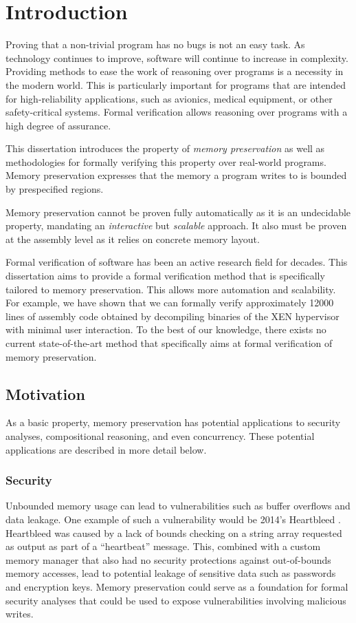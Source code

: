 \chapter{Introduction}
Proving that a non-trivial program has no bugs is not an easy task.
As technology continues to improve, software will continue to increase in complexity.
Providing methods to ease the work of reasoning over programs is a necessity in the modern world.
This is particularly important for programs that are intended for high-reliability applications,
such as avionics, medical equipment, or other safety-critical systems.
Formal verification allows reasoning over programs with a high degree of assurance.

This dissertation introduces the property of \emph{memory preservation}
as well as methodologies for formally verifying this property over real-world programs.
Memory preservation expresses that the memory a program writes to is bounded by prespecified regions.

Memory preservation cannot be proven fully automatically as it is an undecidable property,
mandating an \emph{interactive} but \emph{scalable} approach.
It also must be proven at the assembly level as it relies on concrete memory layout.

Formal verification of software has been an active research field for decades.
This dissertation aims to provide a formal verification method
that is specifically tailored to memory preservation.
This allows more automation and scalability.
For example, we have shown that we can formally verify
approximately \num{12000} lines of assembly code
obtained by decompiling binaries of the XEN hypervisor with minimal user interaction.
To the best of our knowledge, there exists no current state-of-the-art method
that specifically aims at formal verification of memory preservation.

\section{Motivation}
As a basic property, memory preservation has potential applications to security analyses,
compositional reasoning, and even concurrency.
These potential applications are described in more detail below.

\subsection{Security}
Unbounded memory usage can lead to vulnerabilities
such as buffer overflows and data leakage.
One example of such a vulnerability would be 2014's Heartbleed \autocite{heartbleed}.
Heartbleed was caused by a lack of bounds checking on a string array
requested as output as part of a ``heartbeat'' message.
This, combined with a custom memory manager
that also had no security protections against out-of-bounds memory accesses,
lead to potential leakage of sensitive data such as passwords and encryption keys.
Memory preservation could serve as a foundation for formal security analyses
that could be used to expose vulnerabilities involving malicious writes.


